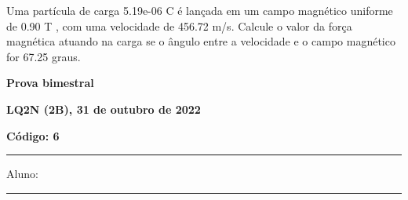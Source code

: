 \documentclass[12pt, addpoints]{exam}
\begin{document}
\begin{questions}
\begin{multicols*}{2}
\begin{oneparchoices}
\end{oneparchoices}
\question[20] Uma partícula de carga 5.19e-06 C é lançada em um campo magnético uniforme de    0.90 T , com uma velocidade de 456.72 m/s. Calcule o valor da força magnética atuando na carga se o ângulo entre a velocidade e o campo magnético for   67.25 graus.

\begin{oneparchoices}
\end{oneparchoices}
\end{multicols*}
\end{questions}
\newpage
        \begin{minipage}[b]{0.75\linewidth}
            \begin{flushleft}
                {\bf \large Prova bimestral}
            \end{flushleft}
            \begin{flushleft}
                {\bf \large LQ2N (2B), 31 de outubro de 2022}
            \end{flushleft}
        \end{minipage}
        \begin{minipage}[b]{0.20\linewidth}
            \begin{flushright}
                {\bf \large Código: 6}
            \end{flushright}
        \end{minipage}
        \vspace{0.5cm} \hrule \vspace{0.5cm}
        \begin{minipage}{0.75\linewidth}
            Aluno:
        \end{minipage}
        \vspace{0.5cm} \hrule \vspace{0.5cm}
\end{document}
